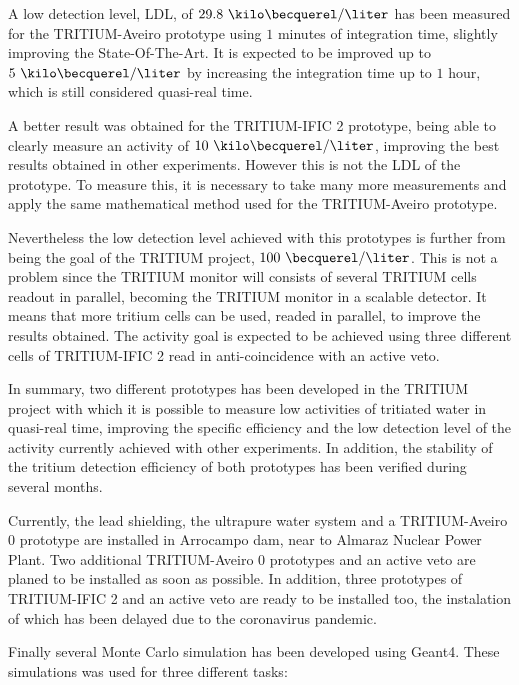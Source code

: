 A low detection level, LDL, of $29.8~\kilo\becquerel/\liter$ has been measured for the TRITIUM-Aveiro prototype using $1$ minutes of integration time, slightly improving the State-Of-The-Art. It is expected to be improved up to $5~\kilo\becquerel/\liter$ by increasing the integration time up to $1$ hour, which is still considered quasi-real time.

A better result was obtained for the TRITIUM-IFIC 2 prototype, being able to clearly measure an activity of $10~\kilo\becquerel/\liter$, improving the best results obtained in other experiments. However this is not the LDL of the prototype. To measure this, it is necessary to take many more measurements and apply the same mathematical method used for the TRITIUM-Aveiro prototype.

Nevertheless the low detection level achieved with this prototypes is further from being the goal of the TRITIUM project, $100~\becquerel/\liter$. This is not a problem since the TRITIUM monitor will consists of several TRITIUM cells readout in parallel, becoming the TRITIUM monitor in a scalable detector. It means that more tritium cells can be used, readed in parallel, to improve the results obtained. The activity goal is expected to be achieved using three different cells of TRITIUM-IFIC 2 read in anti-coincidence with an active veto.

In summary, two different prototypes has been developed in the TRITIUM project with which it is possible to measure low activities of tritiated water in quasi-real time, improving the specific efficiency and the low detection level of the activity currently achieved with other experiments. In addition, the stability of the tritium detection efficiency of both prototypes has been verified during several months.

Currently, the lead shielding, the ultrapure water system and a TRITIUM-Aveiro 0 prototype are installed in Arrocampo dam, near to Almaraz Nuclear Power Plant. Two additional TRITIUM-Aveiro 0 prototypes and an active veto are planed to be installed as soon as possible. In addition, three prototypes of TRITIUM-IFIC 2 and an active veto are ready to be installed too, the instalation of which has been delayed due to the coronavirus pandemic.

Finally several Monte Carlo simulation has been developed using Geant4. These simulations was used for three different tasks:

